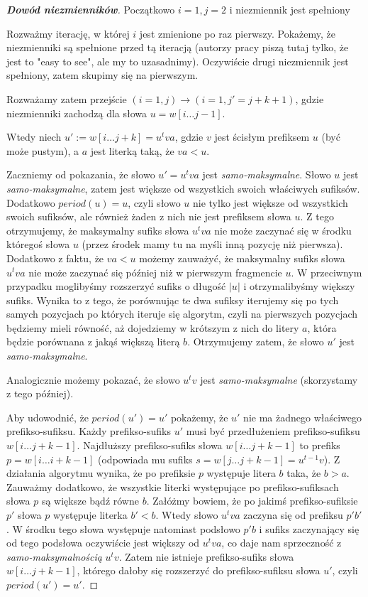 \documentclass{article}
\begin{document}
\begin{proof}[\textbf{Dowód niezmienników}]
Początkowo $i = 1, j = 2$ i niezmiennik jest spełniony

Rozważmy iterację, w której $i$ jest zmienione po raz pierwszy. Pokażemy, że niezmienniki są spełnione przed tą iteracją 
(autorzy pracy piszą tutaj tylko, że jest to "easy to see", ale my to uzasadnimy). Oczywiście drugi niezmiennik jest spełniony, zatem skupimy się na pierwszym.

Rozważamy zatem przejście $(i=1, j) \rightarrow (i=1, j' = j + k + 1)$, gdzie niezmienniki zachodzą dla słowa $u = w[i \ldots j-1]$.

Wtedy niech $u' := w[i\ldots j + k] = u^tva$, gdzie $v$ jest ścisłym prefiksem $u$ (być może pustym), a $a$ jest literką taką, że $va < u$.

Zaczniemy od pokazania, że słowo $u' = u^tva$ jest \textit{samo-maksymalne}. Słowo $u$ jest \textit{samo-maksymalne}, 
zatem jest większe od wszystkich swoich właściwych sufiksów. Dodatkowo $period(u) = u$, czyli słowo $u$ nie tylko jest większe od wszystkich swoich sufiksów, 
ale również żaden z nich nie jest prefiksem słowa $u$. 
Z tego otrzymujemy, że maksymalny sufiks słowa $u^tva$ nie może zaczynać się w środku któregoś słowa $u$ (przez środek mamy tu na myśli inną pozycję niż pierwsza). 
Dodatkowo z faktu, że $va < u$ możemy zauważyć, że maksymalny sufiks słowa $u^tva$ nie może zaczynać się
później niż w pierwszym fragmencie $u$. W przeciwnym przypadku moglibyśmy rozszerzyć sufiks o długość $|u|$ i otrzymalibyśmy 
większy sufiks. Wynika to z tego, że porównując te dwa sufiksy iterujemy się po tych samych pozycjach po których 
iteruje się algorytm, czyli na pierwszych pozycjach będziemy mieli równość, aż dojedziemy w krótszym z nich
do litery $a$, która będzie porównana z jakąś większą literą $b$. 
Otrzymujemy zatem, że słowo $u'$ jest \textit{samo-maksymalne}.

Analogicznie możemy pokazać, że słowo $u^tv$ jest \textit{samo-maksymalne} (skorzystamy z tego później). 

Aby udowodnić, że $period(u') = u'$ pokażemy, że $u'$ nie ma żadnego właściwego prefikso-sufiksu. 
Każdy prefikso-sufiks $u'$ musi być przedłużeniem prefikso-sufiksu $w[i\ldots j+k-1]$. 
Najdłuższy prefikso-sufiks słowa $w[i\ldots j+k-1]$ to prefiks $p = w[i\ldots i+k-1]$ (odpowiada mu sufiks $s = w[j\ldots j+k-1] = u^{t-1}v$).
Z działania algorytmu wynika, że po prefiksie $p$ występuje litera $b$ taka, że $b > a$. 
Zauważmy dodatkowo, że wszystkie literki występujące po prefikso-sufiksach słowa $p$ są większe bądź równe $b$. 
Załóżmy bowiem, że po jakimś prefikso-sufiksie $p'$ słowa $p$ występuje literka $b' < b$. 
Wtedy słowo $u^tva$ zaczyna się od prefiksu $p'b'$. W środku tego słowa występuje natomiast podsłowo $p'b$ 
i sufiks zaczynający się od tego podsłowa oczywiście jest większy od $u^tva$, 
co daje nam sprzeczność z \textit{samo-maksymalnością} $u^tv$. 
Zatem nie istnieje prefikso-sufiks słowa $w[i\ldots j+k-1]$, którego dałoby się rozszerzyć do prefikso-sufiksu słowa $u'$, czyli $period(u') = u'$.


\end{proof}
\end{document}
